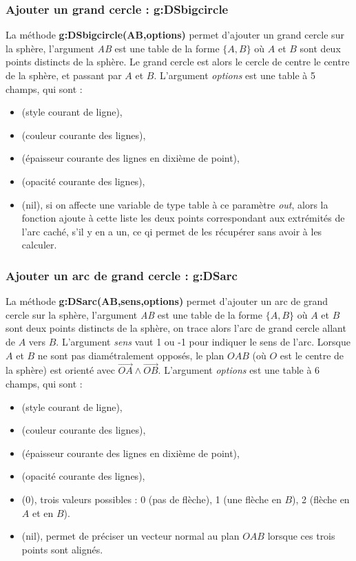 \subsubsection{Ajouter un grand cercle : g:DSbigcircle}

La méthode \textbf{g:DSbigcircle(AB,options)} permet d'ajouter un grand cercle sur la sphère, l'argument \emph{AB} est une table de la forme $\{A,B\}$ où $A$ et $B$ sont deux points distincts de la sphère. Le grand cercle est alors le cercle de centre le centre de la sphère, et passant par $A$ et $B$. L'argument \emph{options} est une table à 5 champs, qui sont :
    \begin{itemize}
        \item {} (style courant de ligne), 
        \item {} (couleur courante des lignes),
        \item {} (épaisseur courante des lignes en dixième de point),
        \item {} (opacité courante des lignes),
        \item {} (nil), si on affecte une variable de type table à ce paramètre \emph{out}, alors la fonction ajoute à cette liste les deux points correspondant aux extrémités de l'arc caché, s'il y en a un, ce qi permet de les récupérer sans avoir à les calculer.
    \end{itemize}

\subsubsection{Ajouter un arc de grand cercle : g:DSarc}

La méthode \textbf{g:DSarc(AB,sens,options)} permet d'ajouter un arc de grand cercle sur la sphère, l'argument \emph{AB} est une table de la forme $\{A,B\}$ où $A$ et $B$ sont deux points distincts de la sphère, on trace alors l'arc de grand cercle allant de $A$ vers $B$. L'argument \emph{sens} vaut 1 ou -1 pour indiquer le sens de l'arc. Lorsque $A$ et $B$ ne sont pas diamétralement opposés, le plan $OAB$ (où $O$ est le centre de la sphère) est orienté avec $\vec{OA}\wedge\vec{OB}$.  L'argument \emph{options} est une table à 6 champs, qui sont :
    \begin{itemize}
        \item {} (style courant de ligne), 
        \item {} (couleur courante des lignes),
        \item {} (épaisseur courante des lignes en dixième de point),
        \item {} (opacité courante des lignes),
        \item {} (0), trois valeurs possibles : 0 (pas de flèche), 1 (une flèche en $B$), 2 (flèche en $A$ et en $B$).
        \item {} (nil), permet de préciser un vecteur normal au plan $OAB$ lorsque ces trois points sont alignés.
    \end{itemize}

